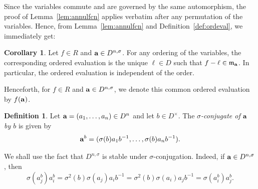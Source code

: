\documentclass[11pt,reqno]{amsart}
\theoremstyle{definition}
\newtheorem{defn}[thm]{Definition}
\newtheorem{cor}[thm]{Corollary}
\begin{document}
Since the variables commute and are governed by the same automorphism, the proof of Lemma~\ref{lem:annulfcn} applies verbatim after any permutation of the variables. Hence, from Lemma~\ref{lem:annulfcn} and Definition~\ref{def:ordeval}, we immediately get:

\begin{cor}\label{cor:evalformon}
Let $f \in R$ and ${\bf a} \in D^{n,\sigma}$. For any ordering of the variables, the corresponding ordered evaluation is the unique $\ell \in D$ such that $f-\ell \in \mathfrak{m}_{{\bf a}}$. In particular, the ordered evaluation is independent of the order.
\end{cor}

Henceforth, for $f \in R$ and ${\bf a} \in D^{n,\sigma}$, we denote this common ordered evaluation by $f({\bf a})$.

\begin{defn}
Let ${\bf a}=(a_1,\dots,a_n) \in D^n$ and let $b \in D^\times$. The \emph{$\sigma$-conjugate of ${\bf a}$ by $b$} is given by
$${\bf a}^b=(\sigma(b) a_1 b^{-1},\dots, \sigma(b) a_n b^{-1}).
$$
\end{defn}
We shall use the fact that $D^{n,\sigma}$ is stable under $\sigma$-conjugation. Indeed, if ${\bf a}\in D^{n,\sigma}$, then
$$
\sigma(a_j^b)a_i^b=\sigma^2(b)\sigma(a_j)a_i b^{-1}=\sigma^2(b)\sigma(a_i)a_j b^{-1}=\sigma(a_i^b)a_j^b.
$$
\end{document}
